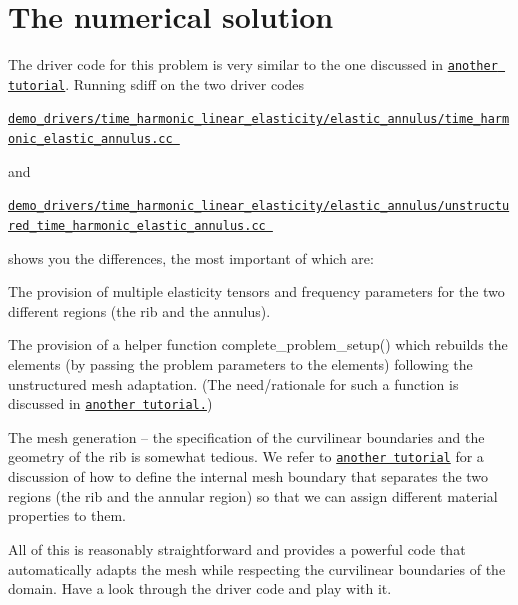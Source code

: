 \hypertarget{index_num}{}\section{The numerical solution}\label{index_num}
The driver code for this problem is very similar to the one discussed in \href{../../elastic_annulus/html/index.html}{\tt another tutorial}. Running {\ttfamily sdiff} on the two driver codes \begin{center} \href{../../../../demo_drivers/time_harmonic_linear_elasticity/elastic_annulus/time_harmonic_elastic_annulus.cc}{\tt demo\+\_\+drivers/time\+\_\+harmonic\+\_\+linear\+\_\+elasticity/elastic\+\_\+annulus/time\+\_\+harmonic\+\_\+elastic\+\_\+annulus.\+cc } \end{center}  and \begin{center} \href{../../../../demo_drivers/time_harmonic_linear_elasticity/elastic_annulus/unstructured_time_harmonic_elastic_annulus.cc}{\tt demo\+\_\+drivers/time\+\_\+harmonic\+\_\+linear\+\_\+elasticity/elastic\+\_\+annulus/unstructured\+\_\+time\+\_\+harmonic\+\_\+elastic\+\_\+annulus.\+cc } \end{center}  shows you the differences, the most important of which are\+:
\begin{DoxyItemize}
\item The provision of multiple elasticity tensors and frequency parameters for the two different regions (the rib and the annulus). ~\newline
~\newline

\item The provision of a helper function {\ttfamily complete\+\_\+problem\+\_\+setup()} which rebuilds the elements (by passing the problem parameters to the elements) following the unstructured mesh adaptation. (The need/rationale for such a function is discussed in \href{../../../meshes/mesh_from_inline_triangle/html/index.html}{\tt another tutorial.}) ~\newline
~\newline

\item The mesh generation -- the specification of the curvilinear boundaries and the geometry of the rib is somewhat tedious. We refer to \href{../../../meshes/mesh_from_inline_triangle_internal_boundaries/html/index.html}{\tt another tutorial} for a discussion of how to define the internal mesh boundary that separates the two regions (the rib and the annular region) so that we can assign different material properties to them. ~\newline
~\newline

\end{DoxyItemize}All of this is reasonably straightforward and provides a powerful code that automatically adapts the mesh while respecting the curvilinear boundaries of the domain. Have a look through the driver code and play with it.



